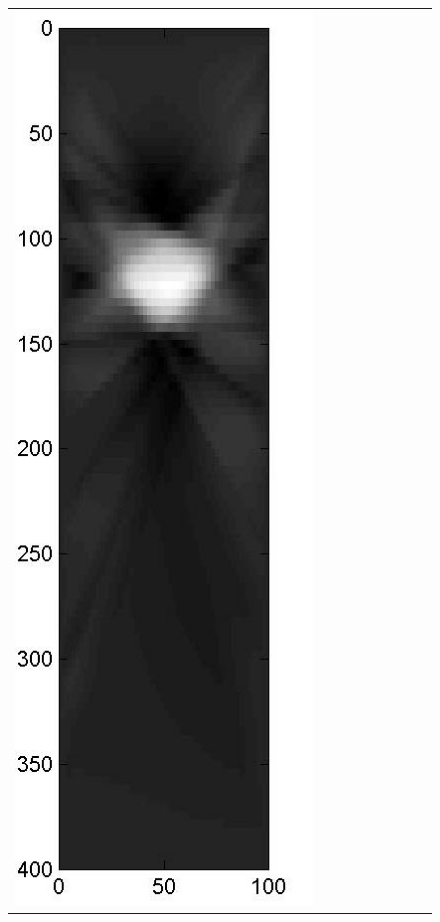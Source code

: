 \documentclass[english]{siamltex}
\begin{document}
{\begin{figure}[!h]
\begin{center}
\begin{tabular}{|c|c|c|c|c|c|c|c|c|}
			\includegraphics[width=.9\iwidth]{figures/newFigs/noisy/resultsExp-2-mk}
			&

\end{tabular}
\end{center}
\end{figure}}
\end{document}
